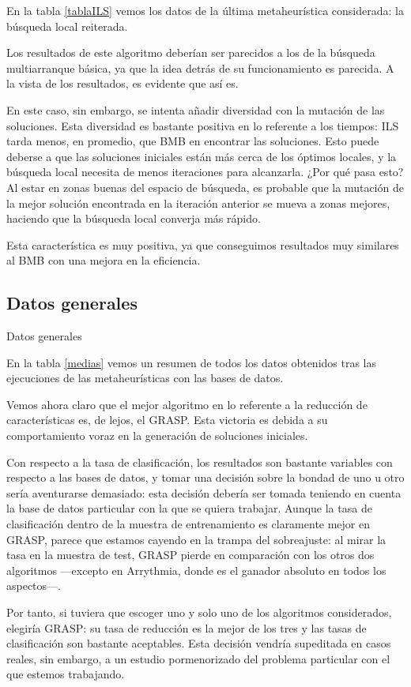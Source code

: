 \documentclass[a4paper, 11pt, titlepage]{article}
\begin{document}
    En la tabla \ref{tablaILS} vemos los datos de la última metaheurística considerada: la búsqueda local reiterada.

    Los resultados de este algoritmo deberían ser parecidos a los de la búsqueda multiarranque básica, ya que la idea detrás de su funcionamiento es parecida. A la vista de los resultados, es evidente que así es.

    En este caso, sin embargo, se intenta añadir diversidad con la mutación de las soluciones. Esta diversidad es bastante positiva en lo referente a los tiempos: ILS tarda menos, en promedio, que BMB en encontrar las soluciones. Esto puede deberse a que las soluciones iniciales están más cerca de los óptimos locales, y la búsqueda local necesita de menos iteraciones para alcanzarla. ¿Por qué pasa esto? Al estar en zonas buenas del espacio de búsqueda, es probable que la mutación de la mejor solución encontrada en la iteración anterior se mueva a zonas mejores, haciendo que la búsqueda local converja más rápido.

    Esta característica es muy positiva, ya que conseguimos resultados muy similares al BMB con una mejora en la eficiencia.

    \subsection{Datos generales}
    \begin{table}[!htb]
        \maketablemean{\dataMedias}
        \caption{Datos generales}
        \label{medias}
    \end{table}

    En la tabla \ref{medias} vemos un resumen de todos los datos obtenidos tras las ejecuciones de las metaheurísticas con las bases de datos.

    Vemos ahora claro que el mejor algoritmo en lo referente a la reducción de características es, de lejos, el GRASP. Esta victoria es debida a su comportamiento voraz en la generación de soluciones iniciales.

    Con respecto a la tasa de clasificación, los resultados son bastante variables con respecto a las bases de datos, y tomar una decisión sobre la bondad de uno u otro sería aventurarse demasiado: esta decisión debería ser tomada teniendo en cuenta la base de datos particular con la que se quiera trabajar. Aunque la tasa de clasificación dentro de la muestra de entrenamiento es claramente mejor en GRASP, parece que estamos cayendo en la trampa del sobreajuste: al mirar la tasa en la muestra de test, GRASP pierde en comparación con los otros dos algoritmos ---excepto en Arrythmia, donde es el ganador absoluto en todos los aspectos---.

    Por tanto, si tuviera que escoger uno y solo uno de los algoritmos considerados, elegiría GRASP: su tasa de reducción es la mejor de los tres y las tasas de clasificación son bastante aceptables. Esta decisión vendría supeditada en casos reales, sin embargo, a un estudio pormenorizado del problema particular con el que estemos trabajando.
\end{document}
